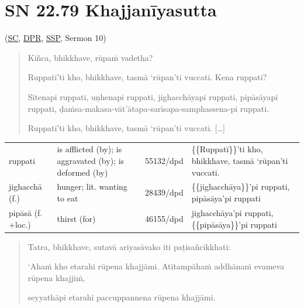 \documentclass[11pt,oneside]{memoir}
\begin{document}

\clearpage

\section{SN 22.79 Khajjanīyasutta}
\label{sec:orgf1d1dcf}

(\href{https://suttacentral.net/sn22.79/pli/ms}{SC}, \href{https://www.digitalpalireader.online/\_dprhtml/index.html?loc=s.2.0.0.0.7.6.m}{DPR}, \href{http://localhost:4848/suttas/sn22.79/pli/ms?quote=Ki\%25C3\%25B1ca\%252C\%2520bhikkhave\%252C\%2520r\%25C5\%25ABpa\%25E1\%25B9\%2581\%2520vadetha\%253F\&window\_type=Sutta+Study}{SSP}, Sermon 10)

\casesLegendHeaderBGHere

\begin{quote}
Kiñca, bhikkhave, rūpaṁ vadetha?

Ruppatī'ti kho, bhikkhave, tasmā ‘rūpan’ti vuccati. Kena ruppati?

Sītenapi ruppati, uṇhenapi ruppati, jighacchāyapi ruppati, pipāsāyapi ruppati,
ḍaṁsa-makasa-vāt'ātapa-sarīsapa-samphassena-pi ruppati.

Ruppatī'ti kho, bhikkhave, tasmā ‘rūpan’ti vuccati. [\ldots{}]
\end{quote}

\begin{longtable}{L{\colOne} L{\colTwo} H H}
ruppati & is afflicted (by); is aggravated (by); is deformed (by) & 55132/dpd & \{\{Ruppatī\}\}'ti kho, bhikkhave, tasmā ‘rūpan’ti vuccati.\\[0pt]
jighacchā (f.) & hunger; lit. wanting to eat & 28439/dpd & \{\{jighacchāya\}\}'pi ruppati, pipāsāya'pi ruppati\\[0pt]
pipāsā (f. +loc.) & thirst (for) & 46155/dpd & jighacchāya'pi ruppati, \{\{pipāsāya\}\}'pi ruppati\\[0pt]
\end{longtable}

\begin{quote}
Tatra, bhikkhave, sutavā ariyasāvako iti paṭisañcikkhati:

‘Ahaṁ kho etarahi rūpena khajjāmi. Atītampāhaṁ addhānaṁ evameva rūpena khajjiṁ,

seyyathāpi etarahi paccuppannena rūpena khajjāmi.
\end{quote}
\end{document}
